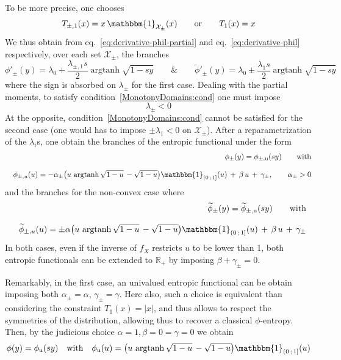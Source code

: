 \documentclass[entropy,article,submit,moreauthors,pdftex]{Definitions/mdpi}
\newcommand{\SZ}[1]{{\color{blue} #1}}                                       %
\def\Rset{\mathbb{R}}%
\def\X{\mathcal{X}}%
\def\un{\mathbbm{1}}%
\def\argtanh{\operatorname{argtanh}}%
\def\u{\mathrm{u}}
\begin{document}
\SZ{To be more precise, one chooses
%
\[
T_{\pm,1}(x) = x \, \un_{\X_\pm}(x)
\qquad \mbox{or} \qquad T_1(x)
= x
\]
%
We     thus    obtain     from    eq.~\eqref{eq:derivative-phil-partial}     and
eq.~\eqref{eq:derivative-phil}  respectively,   over  each  set   $\X_\pm$,  the
branches
%
\[
\phi'_\pm(y)  =  \lambda_0 + \frac{\lambda_{\pm,1} s}{2}  \argtanh\sqrt{1-sy}
  \qquad \mbox{\&} \qquad 
\widetilde{\phi}'_\pm(y)    =   \lambda_0 \pm \frac{\lambda_1 s}{2}
\argtanh\sqrt{1-sy}
\]
%
where the sign is absorbed on $\lambda_\pm$ for the first case. Dealing with the
partial  moments,  to   satisfy  condition~\ref{MonotonyDomains:cond}  one  must
impose $$\lambda_\pm < 0$$ At the opposite, condition~\ref{MonotonyDomains:cond}
cannot be satisfied for the second case  (one would has to impose $\pm \lambda_1
< 0$  on $\X_\pm$).  After a  reparametrization of the $\lambda_i$s,  one obtain
the  branches  of  the  entropic   functional  under  the  form
%
\begin{eqnarray*}
  && \phi_\pm(y)  = \phi_{\pm,\u}(s y) \qquad \mbox{with}
  \\[2.5mm]
%
&& \phi_{\pm,u}(u)  = -  \alpha_\pm \left(  u \,  \argtanh\sqrt{1-u} \,  -
\sqrt{1-u} \right) \un_{\left( 0  \, ; \, 1 \right]}(u) \, + \,  \beta \, u \, +
\, \gamma_\pm, \qquad \alpha_\pm > 0
\end{eqnarray*}
%
and the branches
for the non-convex case where
%
\begin{eqnarray*}
  && \widetilde{\phi}_\pm(y)  = \widetilde{\phi}_{\pm,\u}(s y) \qquad \mbox{with}
  \\[2.5mm]
&& \widetilde{\phi}_{\pm,u}(u)  = \pm \alpha \left(  u \,  \argtanh\sqrt{1-u} \,  -
\sqrt{1-u} \right) \un_{\left( 0  \, ; \, 1 \right]}(u) \, + \,  \beta \, u \, +
\, \gamma_\pm
\end{eqnarray*}
%
In both cases,  even if the inverse of  $f_X$ restricts $u$ to be  lower than 1,
both entropic  functionals can  be extended  to $\Rset_+$  by imposing  $\beta +
\gamma_\pm = 0$.


Remarkably, in  the first case, an  univalued entropic functional can  be obtain
imposing both $\alpha_\pm = \alpha, \,  \gamma_\pm = \gamma$.  Here also, such a
choice is  equivalent than considering the  constraint $T_1(x) = |x|$,  and thus
allows to respect the symmetries of the distribution, allowing thus to recover a
classical $\phi$-entropy.  Then, by the judicious  choice $\alpha = 1, \beta = 0
= \gamma = 0$ we obtain
%
\[
\phi(y) = \phi_\u(s  y) \quad \mbox{with} \quad \phi_\u(u)
= \left( u \, \argtanh\sqrt{1-u} \, - \sqrt{1-u} \right) \un_{\left( 0 \, ; \, 1
  \right]}(u)
\]

}
\end{document}
